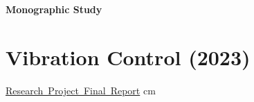 \documentclass[10pt, letterpaper]{article}
\let\hrefWithoutArrow\href
\renewcommand{\href}[2]{\hrefWithoutArrow{#1}{\ifthenelse{\equal{#2}{}}{ }{#2 }\raisebox{.15ex}{\footnotesize \faExternalLink*}}}
\begin{document}
    
    \newpage
    {\fontsize{30pt}{30pt} \textbf{Monographic Study}} %
    
    \vspace{0.3cm}
    
    \section{Vibration Control (2023)}

    \normalsize
    \mbox{\hrefWithoutArrow{https://github.com/liu092111/College_Portfolio/blob/21037b344b215ae4113d7bc832f132e269f00817/Monographic\%20study/Report/\%E5\%A4\%A7\%E5\%B0\%88\%E7\%94\%9F\%E8\%A8\%88\%E7\%95\%AB_\%E5\%8A\%89\%E6\%A8\%BA__\%E6\%9C\%9F\%E6\%9C\%AB\%E5\%A0\%B1\%E5\%91\%8A.pdf}{{\footnotesize\faLink}\hspace*{0.13cm}Research Project Final Report}}%
     cm%
    
\end{document}
